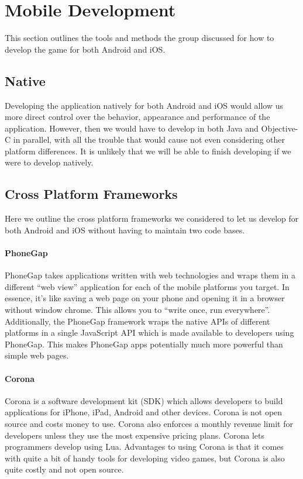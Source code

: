 \section{Mobile Development}

This section outlines the tools and methods the group discussed for how to
develop the game for both Android and iOS.

\subsection{Native}

Developing the application natively for both Android and iOS would allow us more
direct control over the behavior, appearance and performance of the application.
However, then we would have to develop in both Java and Objective-C in parallel,
with all the trouble that would cause not even considering other platform
differences. It is unlikely that we will be able to finish developing if we were
to develop natively.

\subsection{Cross Platform Frameworks}

Here we outline the cross platform frameworks we considered to let us develop for
both Android and iOS without having to maintain two code bases.

\paragraph{PhoneGap}
PhoneGap takes applications written with web technologies and wraps them in
a different ``web view'' application for each of the mobile platforms you
target. In essence, it's like saving a web page on your phone and opening
it in a browser without window chrome. This allows you to ``write once, run
everywhere''. Additionally, the PhoneGap framework wraps the native APIs of
different platforms in a single JavaScript API which is made available to
developers using PhoneGap. This makes PhoneGap apps potentially much more
powerful than simple web pages. \cite{phonegapAbout}

\paragraph{Corona}

Corona is a software development kit (SDK) which allows developers to build
applications for iPhone, iPad, Android and other devices. Corona is not open
source and costs money to use. Corona also enforces a monthly revenue limit for
developers unless they use the most expensive pricing plans\cite{coronaPrice}.
Corona lets programmers develop using Lua.\cite{coronaSDK} Advantages to using
Corona is that it comes with quite a bit of handy tools for developing video
games, but Corona is also quite costly and not open source.

